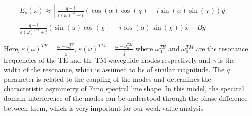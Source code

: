 \documentclass[13pt]{article}
\begin{document}
\begin{multline}
	E_s(\omega) \approx \left[ \frac{q - i }{\varepsilon(\omega)^{TE} + i} (\cos(\alpha)\cos(\chi) - i\sin(\alpha)\sin(\chi)) \hat{y} + \right. \\
	\left. \frac{q - i }{\varepsilon(\omega)^{TM} + i} (\sin(\alpha)\cos(\chi) - i\cos(\alpha)\sin(\chi)) \hat{x} + B \hat{y} \right]
	\label{eqs:WVA Electric field Fano}
\end{multline}

	Here, $\varepsilon(\omega)^{TE} = \frac{\omega - \omega_{0}^{TE}}{\frac{\gamma}{2}}$, $\varepsilon(\omega)^{TM} = \frac{\omega - \omega_{0}^{TM}}{\frac{\gamma}{2}}$ where $\omega_{0}^{TE}$ and $\omega_{0}^{TM}$ are the resonance frequencies of the TE and the TM waveguide modes respectively and $\gamma$ is the width of the resonance, which is assumed to be of similar magnitude. The $q$ parameter is related to the coupling of the modes and determines the characteristic asymmetry of Fano spectral line shape. In this model, the spectral domain interference of the modes can be understood through the phase difference between them, which is very important for our weak value analysis
\end{document}
